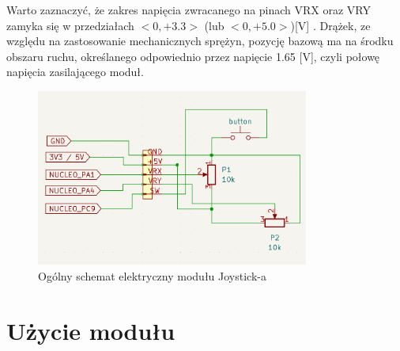 \documentclass[11pt, a4paper]{article}
\begin{document}
Warto zaznaczyć, że zakres napięcia zwracanego na pinach VRX oraz VRY zamyka się w przedziałach $<0, +3.3>$ (lub $<0, +5.0>$)[V] . Drążek, ze względu na zastosowanie mechanicznych sprężyn, pozycję bazową ma na środku obszaru ruchu, określanego odpowiednio przez napięcie 1.65 [V], czyli połowę napięcia zasilającego moduł.



\newpage
\begin{figure}[h]
    \centering
    \includegraphics[width=0.8\textwidth]{fig/Joystick/joystick_schematic.PNG}
    \caption{Ogólny schemat elektryczny modułu Joystick-a}
\end{figure}
\newpage
\section{Użycie modułu}
\end{document}
